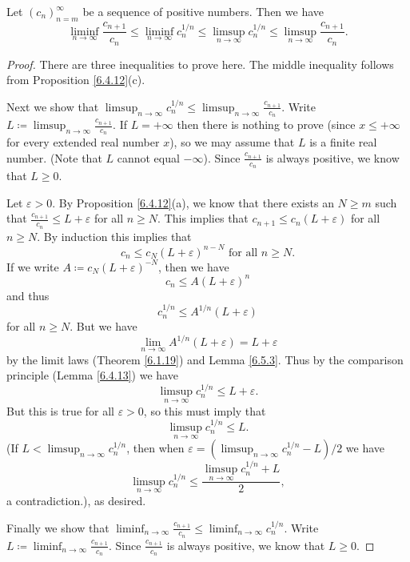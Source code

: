 \begin{lemma}\label{7.5.2}
    Let \((c_n)_{n = m}^\infty\) be a sequence of positive numbers.
    Then we have
    \[
        \liminf_{n \to \infty} \frac{c_{n + 1}}{c_n} \leq \liminf_{n \to \infty} c_n^{1 / n} \leq \limsup_{n \to \infty} c_n^{1 / n} \leq \limsup_{n \to \infty} \frac{c_{n + 1}}{c_n}.
    \]
\end{lemma}

\begin{proof}
    There are three inequalities to prove here.
    The middle inequality follows from Proposition \ref{6.4.12}(c).

    Next we show that \(\limsup_{n \to \infty} c_n^{1 / n} \leq \limsup_{n \to \infty} \frac{c_{n + 1}}{c_n}\).
    Write \(L \coloneqq \limsup_{n \to \infty} \frac{c_{n + 1}}{c_n}\).
    If \(L = +\infty\) then there is nothing to prove (since \(x \leq +\infty\) for every extended real number \(x\)), so we may assume that \(L\) is a finite real number.
    (Note that \(L\) cannot equal \(-\infty\)).
    Since \(\frac{c_{n + 1}}{c_n}\) is always positive, we know that \(L \geq 0\).

    Let \(\varepsilon > 0\).
    By Proposition \ref{6.4.12}(a), we know that there exists an \(N \geq m\) such that \(\frac{c_{n + 1}}{c_n} \leq L + \varepsilon\) for all \(n \geq N\).
    This implies that \(c_{n + 1} \leq c_n (L + \varepsilon)\) for all \(n \geq N\).
    By induction this implies that
    \[
        c_n \leq c_N (L + \varepsilon)^{n - N} \text{ for all } n \geq N.
    \]
    If we write \(A \coloneqq c_N (L + \varepsilon)^{-N}\), then we have
    \[
        c_n \leq A(L + \varepsilon)^n
    \]
    and thus
    \[
        c_n^{1 / n} \leq A^{1 / n} (L + \varepsilon)
    \]
    for all \(n \geq N\).
    But we have
    \[
        \lim_{n \to \infty} A^{1 / n} (L + \varepsilon) = L + \varepsilon
    \]
    by the limit laws (Theorem \ref{6.1.19}) and Lemma \ref{6.5.3}.
    Thus by the comparison principle (Lemma \ref{6.4.13}) we have
    \[
        \limsup_{n \to \infty} c_n^{1 / n} \leq L + \varepsilon.
    \]
    But this is true for all \(\varepsilon > 0\), so this must imply that
    \[
        \limsup_{n \to \infty} c_n^{1 / n} \leq L.
    \]
    (If \(L < \limsup_{n \to \infty} c_n^{1 / n}\), then when \(\varepsilon = (\limsup_{n \to \infty} c_n^{1 / n} - L) / 2\) we have
    \[
        \limsup_{n \to \infty} c_n^{1 / n} \leq \frac{\limsup_{n \to \infty} c_n^{1 / n} + L}{2},
    \]
    a contradiction.), as desired.

    Finally we show that \(\liminf_{n \to \infty} \frac{c_{n + 1}}{c_n} \leq \liminf_{n \to \infty} c_n^{1 / n}\).
    Write \(L \coloneqq \liminf_{n \to \infty} \frac{c_{n + 1}}{c_n}\).
    Since \(\frac{c_{n + 1}}{c_n}\) is always positive, we know that \(L \geq 0\).


\end{proof}
